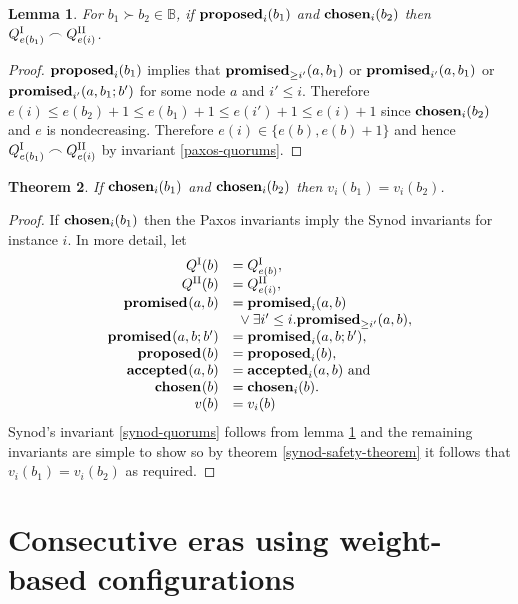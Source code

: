\documentclass[journal]{IEEEtran}
\newtheorem{theorem}{Theorem}
\newtheorem{lemma}[theorem]{Lemma}
\begin{document}
\begin{lemma}\label{paxos-synod-quorum-invariant} For $b_1 \succ b_2 \in
\mathbb B$, if $\mathbf{proposed}_{i}(b_1)$ and $\mathbf{chosen}_{i}(b_2)$ then
${{Q}^\textrm{I}_{e(b_1)} \frown {Q}^\textrm{II}_{e(i)}}$.  \end{lemma}

\begin{proof} $\mathbf{proposed}_{i}(b_1)$ implies that $\mathbf{promised}_{\ge i'}(a,b_1)$ or
$\mathbf{promised}_{i'}(a,b_1)$ or $\mathbf{promised}_{i'}(a,b_1;b')$ for some node $a$ and $i' \le
i$. Therefore $e(i) \le e(b_2) + 1 \le e(b_1) + 1 \le e(i') + 1 \le e(i) + 1$
since $\mathbf{chosen}_{i}(b_2)$ and $e$ is nondecreasing.  Therefore $e(i) \in \{ e(b),
e(b) + 1 \}$ and hence ${{Q}^\textrm{I}_{e(b_1)} \frown {Q}^\textrm{II}_{e(i)}}$ by invariant
\ref{paxos-quorums}.  \end{proof}

\begin{theorem}\label{paxos-safety-theorem} If $\mathbf{chosen}_{i}(b_1)$ and
$\mathbf{chosen}_{i}(b_2)$ then ${v_i(b_1) = v_i(b_2)}$.  \end{theorem}

\begin{proof} If $\mathbf{chosen}_{i}(b_1)$ then the Paxos invariants imply the Synod
invariants for instance $i$.  In more detail, let
\[\begin{array}{rl}
Q^\textrm{I}(b) &= {Q}^\textrm{I}_{e(b)}, \\
Q^\textrm{II}(b) &= {Q}^\textrm{II}_{e(i)}, \\
\mathbf{promised}_{}(a,b) &= \mathbf{promised}_{i}(a,b) \\
& \ {}\vee \exists i' \le i. \mathbf{promised}_{\ge i'}(a,b), \\
\mathbf{promised}_{}(a,b;b') &= \mathbf{promised}_{i}(a,b;b'), \\
\mathbf{proposed}_{}(b) &= \mathbf{proposed}_{i}(b), \\
\mathbf{accepted}_{}(a,b) &= \mathbf{accepted}_{i}(a,b) \textrm{ and} \\
\mathbf{chosen}_{}(b) &= \mathbf{chosen}_{i}(b). \\
v(b) &= v_i(b)\\
\end{array}
\]
Synod's invariant \ref{synod-quorums} follows from lemma
\ref{paxos-synod-quorum-invariant} and the remaining invariants are simple to
show so by theorem \ref{synod-safety-theorem} it follows that $v_i(b_1) =
v_i(b_2)$ as required.  \end{proof}

\section{Consecutive eras using weight-based
configurations}\label{weights-appendix}
\end{document}
